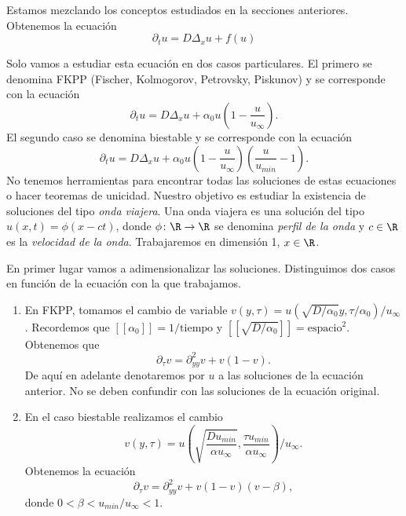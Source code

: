\documentclass{article}
\begin{document}
Estamos mezclando los conceptos estudiados en la secciones anteriores. Obtenemos la ecuación
\begin{equation}
  \label{eq:rea-dif}
  \partial_t u = D \Delta_x u + f(u)
\end{equation}

Solo vamos a estudiar esta ecuación en dos casos particulares. El primero se denomina FKPP (Fischer,
Kolmogorov, Petrovsky, Piskunov) y se corresponde con la ecuación
\begin{equation}
  \label{eq:rea-dif:1}
  \partial_t u = D \Delta_x u + \alpha_0 u \left(1- \frac{u}{ u_{\infty}}\right).
\end{equation}
El segundo caso se denomina biestable y se corresponde con la ecuación
\begin{equation}
  \label{eq:rea-dif:2}
  \partial_t u = D \Delta_x u + \alpha_0 u \left(1- \frac{u}{ u_{\infty}}\right)\left(\frac{u}{ u_{min}}-1\right).
\end{equation}
No tenemos herramientas para encontrar todas las soluciones de estas ecuaciones o hacer teoremas de
unicidad. Nuestro objetivo es estudiar la existencia de soluciones del tipo \emph{onda viajera}. Una
onda viajera es una solución del tipo $u(x,t) = \phi(x-ct)$, donde $\phi \colon \R \to \R$ se
denomina \emph{perfil de la onda} y $c \in \R$ es la \emph{velocidad de la onda}. Trabajaremos en
dimensión 1, $x \in \R$.

En primer lugar vamos a adimensionalizar las soluciones. Distinguimos dos casos en función de la
ecuación con la que trabajamos.
\begin{enumerate}
\item En FKPP, tomamos el cambio de variable
  $v(y, \tau) = u(\sqrt{D / \alpha_0} y, \tau / \alpha_0) / u_{\infty}$. Recordemos que
  $[[ \alpha_0 ]] = 1 / \text{tiempo}$ y $[[ \sqrt{D / \alpha_0} ]] = \text{espacio}^2$. Obtenemos que
  \begin{equation}
    \label{eq:rea-dif:1:ad}
    \partial_{\tau} v = \partial^2_{yy} v + v(1-v).
  \end{equation}
  De aquí en adelante denotaremos por $u$ a las soluciones de la ecuación anterior. No se deben
  confundir con las soluciones de la ecuación original.
\item En el caso biestable realizamos el cambio
  \[ v(y, \tau) = u \left( \sqrt{\frac{D u_{min}}{\alpha u_{\infty}}}, \frac{\tau u_{min}}{\alpha
        u_{\infty}} \right) / u_{\infty}. \] Obtenemos la ecuación
  \begin{equation}
    \label{eq:rea-dif:2:ad}
    \partial_{\tau} v = \partial_{yy}^2 v + v(1-v)(v-\beta),
  \end{equation}
  donde $0 < \beta < u_{min}/u_{\infty} < 1$.
\end{enumerate}
\end{document}
